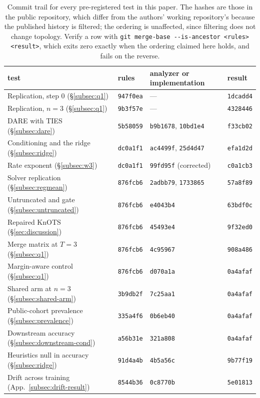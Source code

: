 \begin{table}[tb]
\centering
\small
\caption{Commit trail for every pre-registered test in this paper. The hashes
are those in the public repository, which differ from the authors' working
repository's because the published history is filtered; the ordering is
unaffected, since filtering does not change topology. Verify a row
with \texttt{git merge-base -{}-is-ancestor <rules> <result>}, which exits zero
exactly when the ordering claimed here holds, and fails on the reverse.}
\label{tab:commits}
\begin{tabular}{llll}
\toprule
test & rules & analyzer or implementation & result \\
\midrule
Replication, step 0 (\S\ref{subsec:q1}) & \texttt{947f0ea} &
  --- & \texttt{1dcadd4} \\
Replication, $n=3$ (\S\ref{subsec:q1}) & \texttt{9b3f57e} &
  --- & \texttt{4328446} \\
DARE with TIES (\S\ref{subsec:dare}) & \texttt{5b58059} &
  \texttt{b9b1678}, \texttt{10bd1e4} & \texttt{f33cb02} \\
Conditioning and the ridge (\S\ref{subsec:ridge}) & \texttt{dc0a1f1} &
  \texttt{ac4499f}, \texttt{25d4d47} & \texttt{efa1d2d} \\
Rate exponent (\S\ref{subsec:w3}) & \texttt{dc0a1f1} &
  \texttt{99fd95f} (corrected) & \texttt{c0a1cb3} \\
\addlinespace
Solver replication (\S\ref{subsec:regmean}) & \texttt{876fcb6} &
  \texttt{2adbb79}, \texttt{1733865} & \texttt{57a8f89} \\
Untruncated and gate (\S\ref{subsec:untruncated}) & \texttt{876fcb6} &
  \texttt{e4043b4} & \texttt{63bdf0c} \\
Repaired KnOTS (\S\ref{sec:discussion}) & \texttt{876fcb6} &
  \texttt{45493e4} & \texttt{9f32ed0} \\
Merge matrix at $T=3$ (\S\ref{subsec:q1}) & \texttt{876fcb6} &
  \texttt{4c95967} & \texttt{908a486} \\
\addlinespace
Margin-aware control (\S\ref{subsec:q1}) & \texttt{876fcb6} &
  \texttt{d070a1a} & \texttt{0a4afaf} \\
Shared arm at $n=3$ (\S\ref{subsec:shared-arm}) & \texttt{3b9db2f} &
  \texttt{7c25aa1} & \texttt{0a4afaf} \\
Public-cohort prevalence (\S\ref{subsec:prevalence}) & \texttt{335a4f6} &
  \texttt{0b6eb40} & \texttt{0a4afaf} \\
Downstream accuracy (\S\ref{subsec:downstream-cond}) & \texttt{a56b31e} &
  \texttt{321a808} & \texttt{0a4afaf} \\
Heuristics null in accuracy (\S\ref{subsec:ridge}) & \texttt{91d4a4b} &
  \texttt{4b5a56c} & \texttt{9b77f19} \\
Drift across training (App.~\ref{subsec:drift-result}) & \texttt{8544b36} &
  \texttt{0c8770b} & \texttt{5e01813} \\
\bottomrule
\end{tabular}
\end{table}

